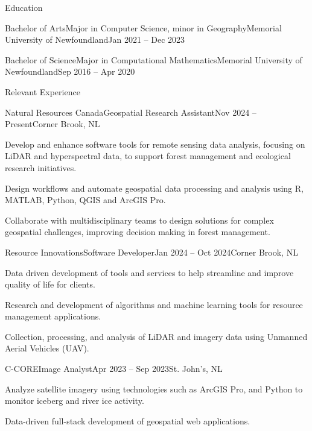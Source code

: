 \documentclass[]{Keenan-Nicholson-Resume}
\begin{document}
\resumeheader
{}
{}
{}
{}
{}

\begin{section}{Education}
    \begin{subsection}{Bachelor of Arts}{Major in Computer Science, minor in Geography}{Memorial University of Newfoundland}{Jan 2021 -- Dec 2023}
    \end{subsection}
    \begin{subsection}{Bachelor of Science}{Major in Computational Mathematics}{Memorial University of Newfoundland}{Sep 2016 -- Apr 2020}
    \end{subsection}
\end{section}

\begin{section}{Relevant Experience}
    \begin{subsection}{Natural Resources Canada}{Geospatial Research Assistant}{Nov 2024 -- Present}{Corner Brook, NL}
        \item Develop and enhance software tools for remote sensing data analysis, focusing on LiDAR and hyperspectral data, to support forest management and ecological research initiatives.
        \item Design workflows and automate geospatial data processing and analysis using R, MATLAB, Python, QGIS and ArcGIS Pro.
        \item Collaborate with multidisciplinary teams to design solutions for complex geospatial challenges, improving decision making in forest management.
    \end{subsection}
    \begin{subsection}{Resource Innovations}{Software Developer}{Jan 2024 -- Oct 2024}{Corner Brook, NL}
        \item Data driven development of tools and services to help streamline and improve quality of life for clients.
        \item Research and development of algorithms and machine learning tools for resource management applications.
        \item Collection, processing, and analysis of LiDAR and imagery data using Unmanned Aerial Vehicles (UAV).
    \end{subsection}
    \begin{subsection}{C-CORE}{Image Analyst}{Apr 2023 -- Sep 2023}{St. John's, NL}
        \item Analyze satellite imagery using technologies such as ArcGIS Pro, and Python to monitor iceberg and river ice activity.
        
        \item Data-driven full-stack development of geospatial web applications.

    \end{subsection}
\end{section}
\end{document}

